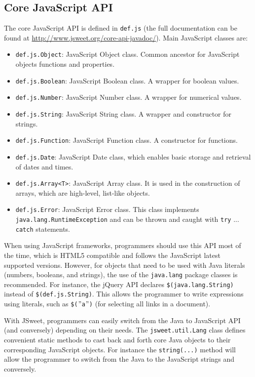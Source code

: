 \documentclass[a4paper]{report}
\begin{document}
\subsection{Core JavaScript API}

The core JavaScript API is defined in \texttt{def.js} (the full documentation can be found at \url{http://www.jsweet.org/core-api-javadoc/}). Main JavaScript classes are:

\begin{itemize}
\item \texttt{def.js.Object}: JavaScript Object class. Common ancestor for JavaScript objects functions and properties.
\item \texttt{def.js.Boolean}: JavaScript Boolean class. A wrapper for boolean values.
\item \texttt{def.js.Number}: JavaScript Number class. A wrapper for numerical values.
\item \texttt{def.js.String}: JavaScript String class. A wrapper and constructor for strings.
\item \texttt{def.js.Function}: JavaScript Function class. A constructor for functions.
\item \texttt{def.js.Date}: JavaScript Date class, which enables basic storage and retrieval of dates and times.
\item \texttt{def.js.Array<T>}: JavaScript Array class. It is used in the construction of arrays, which are high-level, list-like objects.
\item \texttt{def.js.Error}: JavaScript Error class. This class implements \texttt{java.lang.RuntimeException} and can be thrown and caught with \texttt{try} ... \texttt{catch} statements.
\end{itemize}

When using JavaScript frameworks, programmers should use this API most of the time, which is HTML5 compatible and follows the JavaScript latest supported versions. However, for objects that need to be used with Java literals (numbers, booleans, and strings), the use of the \texttt{java.lang} package classes is recommended. For instance, the jQuery API declares \texttt{\$(java.lang.String)} instead of \texttt{\$(def.\-js.\-String)}. This allows the programmer to write expressions using literals, such as \texttt{\$($"$a$"$)} (for selecting all links in a document).

With JSweet, programmers can easily switch from the Java to JavaScript API (and conversely) depending on their needs. The \texttt{jsweet.util.Lang} class defines convenient static methods to cast back and forth core Java objects to their corresponding JavaScript objects. For instance the \texttt{string(...)} method will allow the programmer to switch from the Java to the JavaScript strings and conversely.
\end{document}
